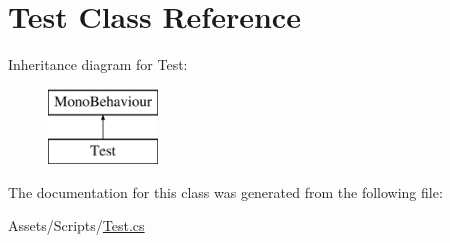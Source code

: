 \hypertarget{class_test}{}\section{Test Class Reference}
\label{class_test}
Inheritance diagram for Test\+:\begin{figure}[H]
\begin{center}
\leavevmode
\includegraphics[height=2.000000cm]{class_test}
\end{center}
\end{figure}


The documentation for this class was generated from the following file\+:\begin{DoxyCompactItemize}
\item 
Assets/\+Scripts/\mbox{\hyperlink{_test_8cs}{Test.\+cs}}\end{DoxyCompactItemize}
